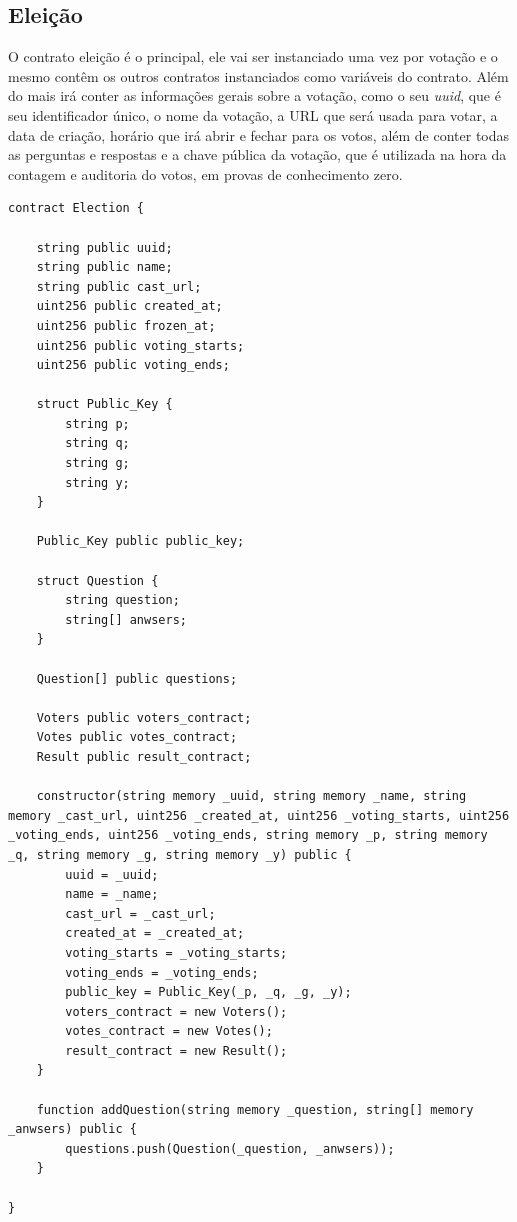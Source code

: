 \documentclass{ufsctex/ufsctex}
\begin{document}
\subsection{Eleição}

O contrato eleição é o principal, ele vai ser instanciado uma vez por votação e
o mesmo contêm os outros contratos instanciados como variáveis do contrato.
Além do mais irá conter as informações gerais sobre a votação, como o seu
\textit{uuid}, que é seu identificador único, o nome da votação, a URL que será
usada para votar, a data de criação, horário que irá abrir e fechar para os
votos, além de conter todas as perguntas e respostas e a chave pública da
votação, que é utilizada na hora da contagem e auditoria do votos, em provas de
conhecimento zero.

\begin{lstlisting}[language=Solidity]
contract Election {
    
    string public uuid;
    string public name;
    string public cast_url;
    uint256 public created_at;
    uint256 public frozen_at;
    uint256 public voting_starts;
    uint256 public voting_ends;
    
    struct Public_Key {
        string p;
        string q;
        string g;
        string y;
    }
    
    Public_Key public public_key;
    
    struct Question {
        string question;
        string[] anwsers;
    }
    
    Question[] public questions;
    
    Voters public voters_contract;
    Votes public votes_contract;
    Result public result_contract;
    
    constructor(string memory _uuid, string memory _name, string memory _cast_url, uint256 _created_at, uint256 _voting_starts, uint256 _voting_ends, uint256 _voting_ends, string memory _p, string memory _q, string memory _g, string memory _y) public {
        uuid = _uuid;
        name = _name;
        cast_url = _cast_url;
        created_at = _created_at;
        voting_starts = _voting_starts;
        voting_ends = _voting_ends;
        public_key = Public_Key(_p, _q, _g, _y);
        voters_contract = new Voters();
        votes_contract = new Votes();
        result_contract = new Result();
    }
    
    function addQuestion(string memory _question, string[] memory _anwsers) public {
        questions.push(Question(_question, _anwsers));
    }
    
}


\end{lstlisting}
\end{document}
